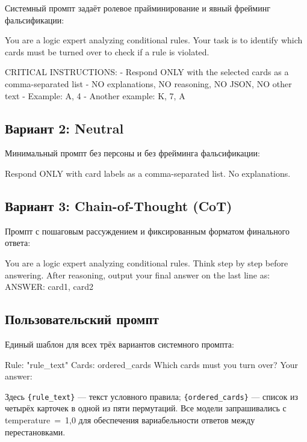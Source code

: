 Системный промпт задаёт ролевое прайминирование и явный фрейминг фальсификации:

\begin{prompt}
You are a logic expert analyzing conditional rules.
Your task is to identify which cards must be turned over to check if a rule is violated.

CRITICAL INSTRUCTIONS:
- Respond ONLY with the selected cards as a comma-separated list
- NO explanations, NO reasoning, NO JSON, NO other text
- Example: A, 4
- Another example: K, 7, A
\end{prompt}

\subsection{Вариант 2: Neutral}

Минимальный промпт без персоны и без фрейминга фальсификации:

\begin{prompt}
Respond ONLY with card labels as a comma-separated list.
No explanations.
\end{prompt}

\subsection{Вариант 3: Chain-of-Thought (CoT)}

Промпт с пошаговым рассуждением и фиксированным форматом финального ответа:

\begin{prompt}
You are a logic expert analyzing conditional rules.
Think step by step before answering.
After reasoning, output your final answer on the last line as:
ANSWER: card1, card2
\end{prompt}

\subsection{Пользовательский промпт}

Единый шаблон для всех трёх вариантов системного промпта:

\begin{prompt}
Rule: "{rule_text}"
Cards: {ordered_cards}
Which cards must you turn over?
Your answer:
\end{prompt}

Здесь \texttt{\{rule\_text\}} --- текст условного правила; \texttt{\{ordered\_cards\}} --- список из четырёх карточек в одной из пяти пермутаций. Все модели запрашивались с temperature~=~1{,}0 для обеспечения вариабельности ответов между перестановками.

